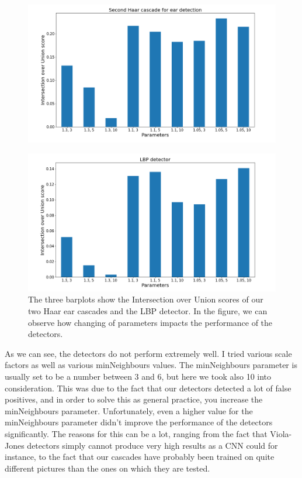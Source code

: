 \documentclass[9pt]{IEEEtran}
\begin{document}
\begin{figure}[H]
    \centering
    \includegraphics[width=1\columnwidth]{plot_1.2}
    \label{fig:plot_1.2}
\end{figure}

\begin{figure}[H]
    \centering
    \includegraphics[width=1\columnwidth]{plot_1.3}
    \caption{The three barplots show the Intersection over Union scores of our two Haar ear cascades and the LBP detector. In the figure, we can observe how changing of parameters impacts the performance of the detectors.}
    \label{fig:plot_1.3}
\end{figure}

As we can see, the detectors do not perform extremely well. I tried various scale factors as well as various minNeighbours values. The minNeighbours parameter is usually set to be a number between 3 and 6, but here we took also 10 into consideration. This was due to the fact that our detectors detected a lot of false positives, and in order to solve this as general practice, you increase the minNeighbours parameter. Unfortunately, even a higher value for the minNeighbours parameter didn't improve the performance of the detectors significantly. The reasons for this can be a lot, ranging from the fact that Viola-Jones detectors simply cannot produce very high results as a CNN could for instance, to the fact that our cascades have probably been trained on quite different pictures than the ones on which they are tested. 
\end{document}
